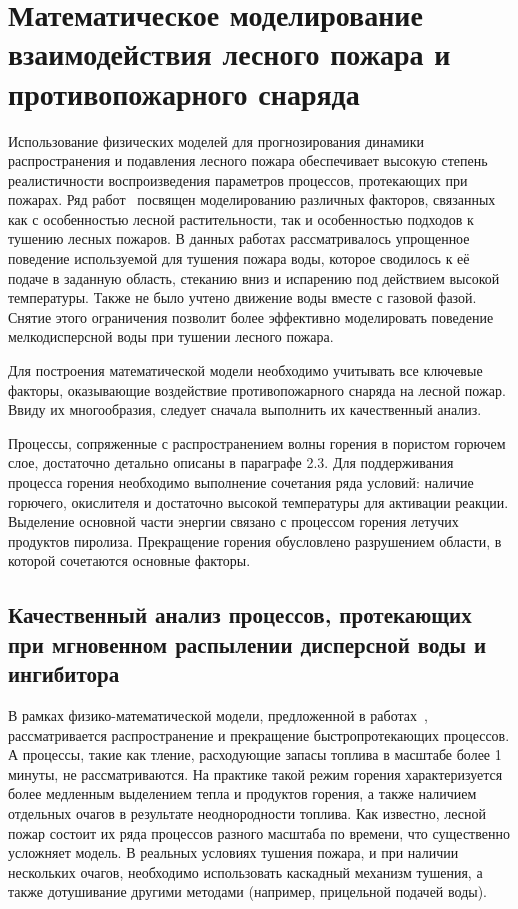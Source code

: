 \chapter{Математическое моделирование взаимодействия лесного пожара и противопожарного снаряда}\label{ch:ch2}

Использование физических моделей для прогнозирования динамики распространения и подавления лесного пожара обеспечивает
высокую степень реалистичности воспроизведения параметров процессов, протекающих при пожарах.
Ряд работ~\cite{on_the_laws_of_combustion_wave_supp, belyaev_natural_and_artificial_barrier, sergey_on_influence_of_water_barrier_on_forest_fire}
посвящен моделированию различных факторов, связанных как с особенностью лесной растительности, так и особенностью
подходов к тушению лесных пожаров.
В данных работах рассматривалось упрощенное поведение используемой для тушения пожара воды, которое сводилось к её
подаче в заданную область, стеканию вниз и испарению под действием высокой температуры.
Также не было учтено движение воды вместе с газовой фазой.
Снятие этого ограничения позволит более эффективно моделировать поведение мелкодисперсной воды при тушении лесного
пожара.

Для построения математической модели необходимо учитывать все ключевые факторы, оказывающие воздействие
противопожарного снаряда на лесной пожар.
Ввиду их многообразия, следует сначала выполнить их качественный анализ.

Процессы, сопряженные с распространением волны горения в пористом горючем слое, достаточно детально
описаны в параграфе 2.3.
Для поддерживания процесса горения необходимо выполнение сочетания ряда условий: наличие горючего, окислителя и
достаточно высокой температуры для активации реакции.
Выделение основной части энергии связано с процессом горения летучих продуктов пиролиза.
Прекращение горения обусловлено разрушением области, в которой сочетаются основные факторы.

\section{Качественный анализ процессов, протекающих при мгновенном распылении дисперсной воды и ингибитора}\label{sec:ch2/sec1}

В рамках физико-математической модели, предложенной в работах~\cite{on_the_laws_of_combustion_wave_supp, belyaev_natural_and_artificial_barrier, sergey_on_influence_of_water_barrier_on_forest_fire},
рассматривается распространение и прекращение быстропротекающих процессов.
А процессы, такие как тление, расходующие запасы топлива в масштабе более 1 минуты, не рассматриваются.
На практике такой режим горения характеризуется более медленным выделением тепла и продуктов горения, а также
наличием отдельных очагов в результате неоднородности топлива.
Как известно, лесной пожар состоит их ряда процессов разного масштаба по времени, что существенно усложняет модель.
В реальных условиях тушения пожара, и при наличии нескольких очагов, необходимо использовать каскадный механизм
тушения, а также дотушивание другими методами (например, прицельной подачей воды).

